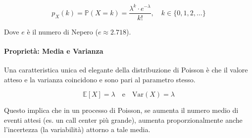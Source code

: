 \begin{equation}
\boxed{p_X(k) = \mathbb{P}(X=k) = \frac{\lambda^k \cdot e^{-\lambda}}{k!}, \quad k \in \{0, 1, 2, \dots\}}
\end{equation}

Dove $e$ è il numero di Nepero ($e \approx 2.718$).

\paragraph{Proprietà: Media e Varianza}
Una caratteristica unica ed elegante della distribuzione di Poisson è che il valore atteso e la varianza coincidono e sono pari al parametro stesso.

\begin{equation}
\mathbb{E}[X] = \lambda \quad \text{e} \quad \text{Var}(X) = \lambda
\end{equation}

Questo implica che in un processo di Poisson, se aumenta il numero medio di eventi attesi (es. un call center più grande), aumenta proporzionalmente anche l'incertezza (la variabilità) attorno a tale media.

